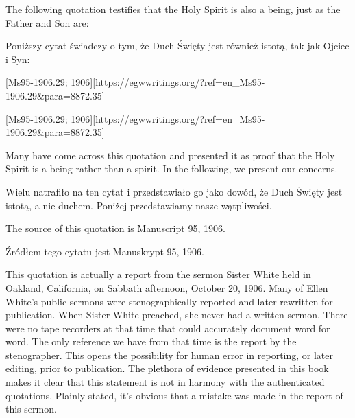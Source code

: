 The following quotation testifies that the Holy Spirit is also a being, just as the Father and Son are:


Poniższy cytat świadczy o tym, że Duch Święty jest również istotą, tak jak Ojciec i Syn:


[Ms95-1906.29; 1906][https://egwwritings.org/?ref=en\_Ms95-1906.29&para=8872.35]


[Ms95-1906.29; 1906][https://egwwritings.org/?ref=en\_Ms95-1906.29&para=8872.35]


Many have come across this quotation and presented it as proof that the Holy Spirit is a being rather than a spirit. In the following, we present our concerns.


Wielu natrafiło na ten cytat i przedstawiało go jako dowód, że Duch Święty jest istotą, a nie duchem. Poniżej przedstawiamy nasze wątpliwości.


The source of this quotation is Manuscript 95, 1906.


Źródłem tego cytatu jest Manuskrypt 95, 1906.


This quotation is actually a report from the sermon Sister White held in Oakland, California, on Sabbath afternoon, October 20, 1906. Many of Ellen White’s public sermons were stenographically reported and later rewritten for publication. When Sister White preached, she never had a written sermon. There were no tape recorders at that time that could accurately document word for word. The only reference we have from that time is the report by the stenographer. This opens the possibility for human error in reporting, or later editing, prior to publication. The plethora of evidence presented in this book makes it clear that this statement is not in harmony with the authenticated quotations. Plainly stated, it’s obvious that a mistake was made in the report of this sermon.



